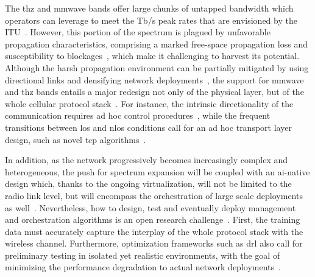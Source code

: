 The \gls{thz} and \gls{mmwave} bands offer large chunks of untapped bandwidth which operators can leverage to meet the Tb/s peak rates that are envisioned by the ITU~\cite{imt2030}. However, this portion of the spectrum is plagued by unfavorable propagation characteristics, comprising a marked free-space propagation loss 
and susceptibility to blockages~\cite{han2018propagation, jornet2011channel}, which make it challenging to harvest its potential. Although the harsh propagation environment can be partially mitigated by using directional links 
and densifying network deployments~\cite{polese2020toward}, 
the support for \gls{mmwave} and \gls{thz} bands entails a major redesign not only of the physical layer, but of the whole cellular protocol stack~\cite{shafi2018microwave}. For instance, the intrinsic directionality of the communication requires ad hoc control procedures~\cite{heng2021six},
while the frequent transitions between \gls{los} and \gls{nlos} conditions call for an ad hoc transport layer design, such as novel \gls{tcp} algorithms~\cite{zhang2019will}. 

In addition, as the network progressively becomes increasingly complex and heterogeneous, the push for spectrum expansion will be coupled with an \gls{ai}-native design which, thanks to the ongoing virtualization, will not be limited to the radio link level, but will encompass the orchestration of large scale deployments as well~\cite{polese2023understanding}.
Nevertheless, how to design, test and eventually deploy management and orchestration algorithms is an open research challenge~\cite{polese2022colo}.
First, the training data must accurately capture the interplay of the whole protocol stack with the wireless channel. Furthermore, optimization frameworks such as \gls{drl} also call for preliminary testing in isolated yet realistic environments, with the goal of minimizing the performance degradation to actual network deployments~\cite{lacava2022programmable, amir2023safehaul}.

